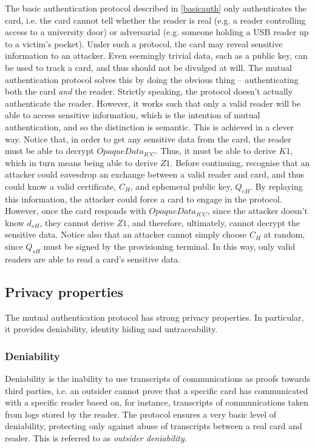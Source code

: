 \documentclass[12pt,a4paper,twoside,openright]{report}
\begin{document}
The basic authentication protocol described in \autoref{basicauth} only authenticates the card, i.e. the card cannot tell whether the reader is real (e.g. a reader controlling access to a university door) or adversarial (e.g. someone holding a USB reader up to a victim's pocket). Under such a protocol, the card may reveal sensitive information to an attacker. Even seemingly trivial data, such as a public key, can be used to track a card, and thus should not be divulged at will. The mutual authentication protocol solves this by doing the obvious thing -- authenticating both the card \emph{and} the reader. Strictly speaking, the protocol doesn't actually authenticate the reader. However, it works such that only a valid reader will be able to access sensitive information, which is the intention of mutual authentication, and so the distinction is semantic. This is achieved in a clever way. Notice that, in order to get any sensitive data from the card, the reader must be able to decrypt $OpaqueData_{ICC}$. Thus, it must be able to derive $K1$, which in turn means being able to derive $Z1$. Before continuing, recognise that an attacker could eavesdrop an exchange between a valid reader and card, and thus could know a valid certificate, $C_{H}$, and ephemeral public key, $Q_{eH}$. By replaying this information, the attacker could force a card to engage in the protocol. However, once the card responds with $OpaqueData_{ICC}$, since the attacker doesn't know $d_{sH}$, they cannot derive $Z1$, and therefore, ultimately, cannot decrypt the sensitive data. Notice also that an attacker cannot simply choose $C_{H}$ at random, since $Q_{sH}$ must be signed by the provisioning terminal. In this way, only valid readers are able to read a card's sensitive data.

\subsection{Privacy properties}

The mutual authentication protocol has strong privacy properties. In particular, it provides deniability, identity hiding and untraceability.

\subsubsection{Deniability}

Deniability is the inability to use transcripts of communications as proofs towards third parties, i.e. an outsider cannot prove that a specific card has communicated with a specific reader based on, for instance, transcripts of communications taken from logs stored by the reader. The protocol ensures a very basic level of deniability, protecting only against abuse of transcripts between a real card and reader. This is referred to as \emph{outsider deniability}.
\end{document}

